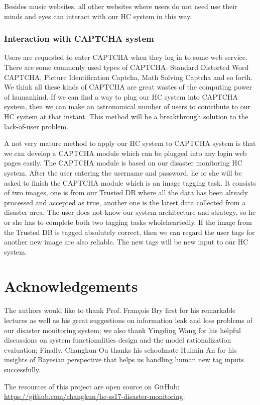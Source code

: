 Besides music websites, all other websites where users do not need use their minds and eyes can interact with our HC system in this way.

\subsubsection{Interaction with CAPTCHA system}
Users are requested to enter CAPTCHA when they log in to some web service. There are some commonly used types of CAPTCHA: Standard Distorted Word CAPTCHA, Picture Identification Captcha, Math Solving Captcha and so forth. We think all these kinds of CAPTCHA are great wastes of the computing power of humankind. If we can find a way to plug our HC system into CAPTCHA system, then we can make an astronomical number of users to contribute to our HC system at that instant. This method will be a breakthrough solution to the lack-of-user problem.

A not very mature method to apply our HC system to CAPTCHA system is that we can develop a CAPTCHA module which can be plugged into any login web pages easily. The CAPTCHA module is based on our disaster monitoring HC system. After the user entering the username and password, he or she will be asked to finish the CAPTCHA module which is an image tagging task. It consists of two images, one is from our Trusted DB where all the data has been already processed and accepted as true, another one is the latest data collected from a disaster area. The user does not know our system architecture and strategy, so he or she has to complete both two tagging tasks wholeheartedly. If the image from the Trusted DB is tagged absolutely correct, then we can regard the user tags for another new image are also reliable. The new tags will be new input to our HC system.

\section*{Acknowledgements}
The authors would like to thank Prof. Fran\c{c}ois Bry first for his remarkable lectures as well as
his great suggestions on information leak and loss problems of our disaster monitoring system;
we also thank Yingding Wang for his helpful discussions on system functionalities design 
and the model rationalization evaluation;
Finally, Changkun Ou thanks his schoolmate Huimin An for his insights of Bayesian perspective that
helps us handling human new tag inputs successfully.

The resources of this project are open source on GitHub: \\
\url{https://github.com/changkun/hc-ss17-disaster-monitoring}.
